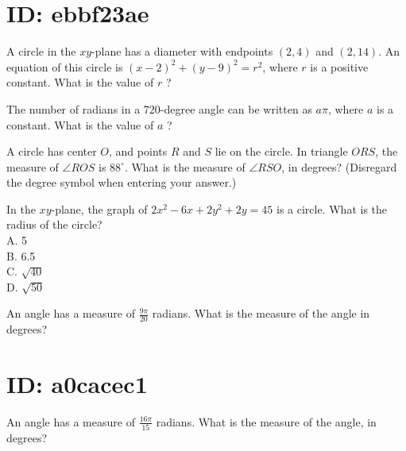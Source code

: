 \section*{ID: ebbf23ae}
A circle in the $x y$-plane has a diameter with endpoints $(2,4)$ and $(2,14)$. An equation of this circle is $(x-2)^{2}+(y-9)^{2}=r^{2}$, where $r$ is a positive constant. What is the value of $r$ ?























































The number of radians in a 720-degree angle can be written as $a \pi$, where $a$ is a constant. What is the value of $a$ ?

A circle has center $O$, and points $R$ and $S$ lie on the circle. In triangle $O R S$, the measure of $\angle R O S$ is $88^{\circ}$. What is the measure of $\angle R S O$, in degrees? (Disregard the degree symbol when entering your answer.)

In the $x y$-plane, the graph of $2 x^{2}-6 x+2 y^{2}+2 y=45$ is a circle. What is the radius of the circle?\\
A. 5\\
B. 6.5\\
C. $\sqrt{40}$\\
D. $\sqrt{50}$

An angle has a measure of $\frac{9 \pi}{20}$ radians. What is the measure of the angle in degrees?

\section*{ID: a0cacec1}
An angle has a measure of $\frac{16 \pi}{15}$ radians. What is the measure of the angle, in degrees?

